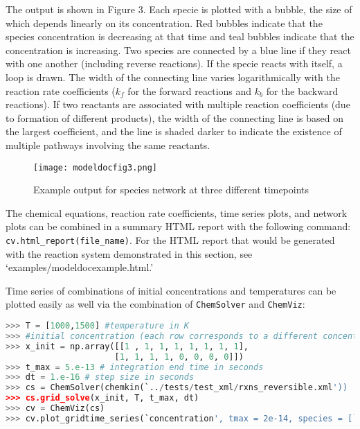 \documentclass[12pt]{article}
\begin{document}
The output is shown in Figure 3. Each specie is plotted with a bubble, the size of which depends linearly on its concentration. Red bubbles indicate that the species concentration is decreasing at that time and teal bubbles indicate that the concentration is increasing. Two species are connected by a blue line if they react with one another (including reverse reactions). If the specie reacts with itself, a loop is drawn. The width of the connecting line varies logarithmically with the reaction rate coefficients ($k_f$ for the forward reactions and $k_b$ for the backward reactions). If two reactants are associated with multiple reaction coefficients (due to formation of different products), the width of the connecting line is based on the largest coefficient, and the line is shaded darker to indicate the existence of multiple pathways involving the same reactants. 

\begin{figure}[h!]
  \caption{Example output for species network at three different timepoints}
  \centering
  \texttt{[image: modeldocfig3.png]}
\end{figure}

The chemical equations, reaction rate coefficients, time series plots, and network plots can be combined in a summary HTML report with the following command:\\
\texttt{cv.html\_report(file\_name)}. For the HTML report that would be generated with the reaction system demonstrated in this section, see `examples/modeldocexample.html.'

Time series of combinations of initial concentrations and temperatures can be plotted easily as well via the combination of \texttt{ChemSolver} and \texttt{ChemViz}:

\begin{lstlisting}[language = Python, basicstyle = \ttfamily,columns = fullflexible, showstringspaces = False]
>>> T = [1000,1500] #temperature in K
>>> #initial concentration (each row corresponds to a different concentration vector)
>>> x_init = np.array([[1 , 1, 1, 1, 1, 1, 1, 1],
                      [1, 1, 1, 1, 0, 0, 0, 0]]) 
>>> t_max = 5.e-13 # integration end time in seconds
>>> dt = 1.e-16 # step size in seconds
>>> cs = ChemSolver(chemkin(`../tests/test_xml/rxns_reversible.xml'))
>>> cs.grid_solve(x_init, T, t_max, dt)
>>> cv = ChemViz(cs)
>>> cv.plot_gridtime_series(`concentration', tmax = 2e-14, species = [`H', `OH', `O2'], outputfile = `modeldocfig4.png')
\end{lstlisting}
\end{document}
